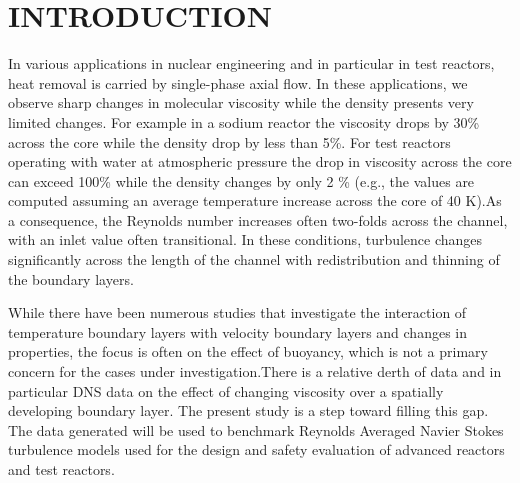 \documentclass[twocolumn,10pt]{asme2e}
\begin{document}
\begin{nomenclature}
\end{nomenclature}


\section*{INTRODUCTION}
In various applications in nuclear engineering and in particular in test reactors, heat removal is carried by single-phase axial flow. In these applications, we observe sharp changes in molecular viscosity while the density presents very limited changes.  For example in a sodium reactor the viscosity drops by 30\% across the core \cite{finkthermodynamic} while the density drop by less than 5\%.  For test reactors operating with water at atmospheric pressure the drop in viscosity across the core can exceed 100\% while the density changes by only 2 \% (e.g., the values are computed assuming an average temperature increase across the core of 40 K).As a consequence, the Reynolds number increases often two-folds across the channel, with an inlet value often transitional.  In these conditions, turbulence changes significantly across the length of the channel with redistribution and thinning of the boundary layers.

While there have been numerous studies that investigate the interaction of temperature boundary layers with velocity boundary layers and changes in properties, the focus is often on the effect of buoyancy, which is not a primary concern for the cases under investigation.There is a relative derth of data and in particular DNS data on the effect of changing viscosity over a spatially developing boundary layer. The present study is a step toward filling this  gap. The data generated will be used to benchmark Reynolds Averaged Navier Stokes turbulence models used for the design and safety evaluation of advanced reactors and test reactors.
\end{document}
